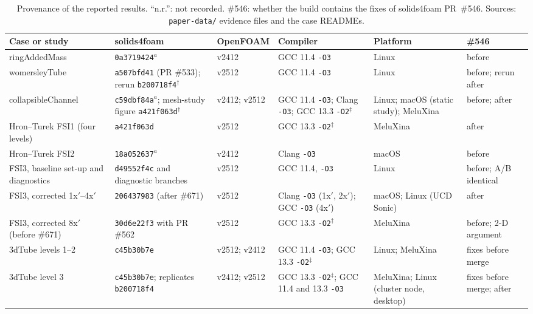 \begin{table}[htbp]
	\centering
	\footnotesize
	\setlength{\tabcolsep}{3pt}
	\caption{Provenance of the reported results. ``n.r.'': not recorded. \#546: whether the build contains the fixes of solids4foam PR~\#546. Sources: \texttt{paper-data/} evidence files and the case READMEs.}
	\label{tab:provenance}
	\begin{tabular}{p{2.9cm}p{2.5cm}p{1.5cm}p{2.4cm}p{1.8cm}p{2.1cm}}
		\toprule
		Case or study & solids4foam & OpenFOAM & Compiler & Platform & \#546 \\
		\midrule
		ringAddedMass & \texttt{0a3719424}$^a$ & v2412 & GCC 11.4 \texttt{-O3} & Linux & before \\
		womersleyTube & \texttt{a507bfd41} (PR \#533); rerun \texttt{b200718f4}$^\dagger$ & v2512 & GCC 11.4 \texttt{-O3} & Linux & before; rerun after \\
		collapsibleChannel & \texttt{c59dbf84a}$^a$; mesh-study figure \texttt{a421f063d}$^\dagger$ & v2412; v2512 & GCC 11.4 \texttt{-O3}; Clang \texttt{-O3}; GCC 13.3 \texttt{-O2}$^\ddagger$ & Linux; macOS (static study); MeluXina & before; after \\
		Hron--Turek FSI1 (four levels) & \texttt{a421f063d} & v2512 & GCC 13.3 \texttt{-O2}$^\ddagger$ & MeluXina & after \\
		Hron--Turek FSI2 & \texttt{18a052637}$^a$ & v2412 & Clang \texttt{-O3} & macOS & before \\
		FSI3, baseline set-up and diagnostics & \texttt{d49552f4c} and diagnostic branches & v2512 & GCC 11.4, \texttt{-O3} & Linux & before; A/B identical \\
		FSI3, corrected 1x$'$--4x$'$ & \texttt{206437983} (after \#671) & v2512 & Clang \texttt{-O3} (1x$'$, 2x$'$); GCC \texttt{-O3} (4x$'$) & macOS; Linux (UCD Sonic) & after \\
		FSI3, corrected 8x$'$ (before \#671) & \texttt{30d6e22f3} with PR \#562 & v2512 & GCC 13.3 \texttt{-O2}$^\ddagger$ & MeluXina & before; 2-D argument \\
		3dTube levels 1--2 & \texttt{c45b30b7e} & v2512; v2412 & GCC 11.4 \texttt{-O3}; GCC 13.3 \texttt{-O2}$^\ddagger$ & Linux; MeluXina & fixes before merge \\
		3dTube level 3 & \texttt{c45b30b7e}; replicates \texttt{b200718f4} & v2412; v2512 & GCC 13.3 \texttt{-O2}$^\ddagger$; GCC 11.4 and 13.3 \texttt{-O3} & MeluXina; Linux (cluster node, desktop) & fixes before merge; after \\

\end{tabular}
\end{table}
